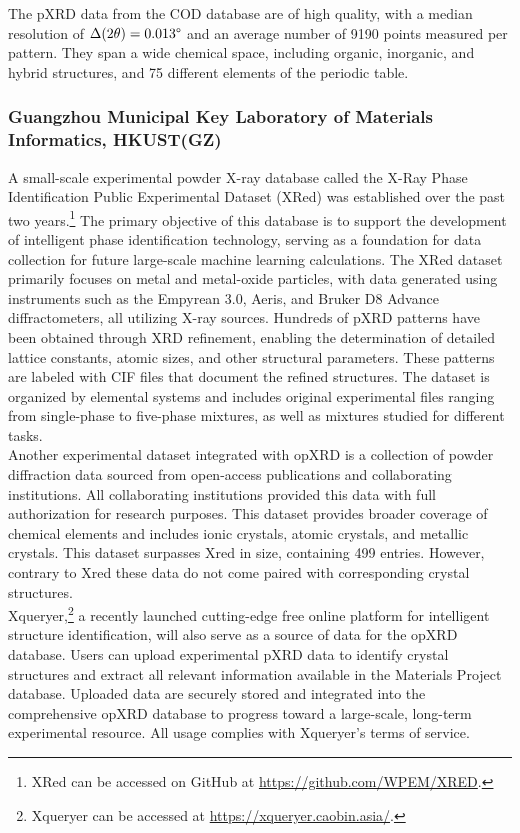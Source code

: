 The pXRD data from the COD database are of high quality, with a median resolution of $\Delta(2\theta) = 0.013\degree$ and an average number of 9190 points measured per pattern. They span a wide chemical space, including organic, inorganic, and hybrid structures, and 75 different elements of the periodic table.

\subsubsection*{Guangzhou Municipal Key Laboratory of Materials Informatics, HKUST(GZ)}

A small-scale experimental powder X-ray database called the X-Ray Phase Identification Public Experimental Dataset (XRed) was established over the past two years.\footnote{XRed can be accessed on GitHub at \url{https://github.com/WPEM/XRED}.} The primary objective of this database is to support the development of intelligent phase identification technology, serving as a foundation for data collection for future large-scale machine learning calculations. The XRed dataset primarily focuses on metal and metal-oxide particles, with data generated using instruments such as the Empyrean 3.0, Aeris, and Bruker D8 Advance diffractometers, all utilizing  X-ray sources. Hundreds of pXRD patterns have been obtained through XRD refinement, enabling the determination of detailed lattice constants, atomic sizes, and other structural parameters. These patterns are labeled with CIF files that document the refined structures. The dataset is organized by elemental systems and includes original experimental files ranging from single-phase to five-phase mixtures, as well as mixtures studied for different tasks. \\

Another experimental dataset integrated with opXRD is a collection of powder diffraction data sourced from open-access publications and collaborating institutions. All collaborating institutions provided this data with full authorization for research purposes. This dataset provides broader coverage of chemical elements and includes ionic crystals, atomic crystals, and metallic crystals. This dataset surpasses Xred in size, containing 499 entries. However, contrary to Xred these data do not come paired with corresponding crystal structures. \\


Xqueryer,\footnote{Xqueryer can be accessed at \url{https://xqueryer.caobin.asia/}.} a recently launched cutting-edge free online platform for intelligent structure identification, will also serve as a source of data for the opXRD database. Users can upload experimental pXRD data to identify crystal structures and extract all relevant information available in the Materials Project database\cite{jain2013commentary}. Uploaded data are securely stored and integrated into the comprehensive opXRD database to progress toward a large-scale, long-term experimental resource. All usage complies with Xqueryer's terms of service.


